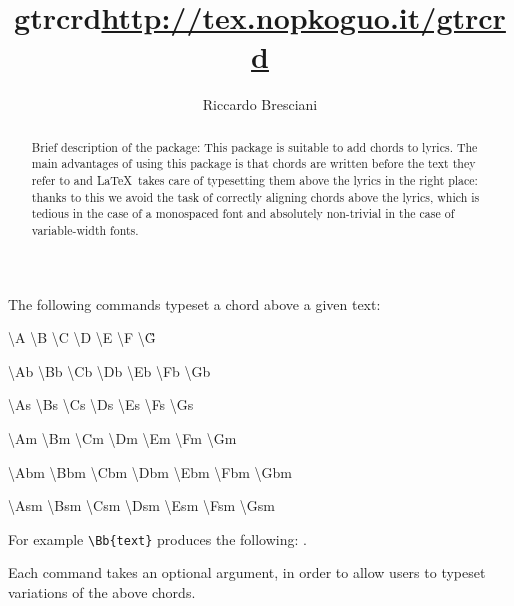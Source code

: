 \documentclass[green,a4paper,oneside,openany,noparindent,noparskip,article,nomatter]{bookest}
\author{Riccardo Bresciani}
\title{gtrcrd\hfill{\small\href{http://tex.nopkoguo.it/gtrcrd}{http://tex.nopkoguo.it/gtrcrd}}}
\makeatletter
\newcommand{\belowLine}{{\normalsize Version 1.1 --- \today}}
\renewcommand{\maketitle}{\thispagestyle{plain}{\Huge\textbf{\colorB\@title}\Large\\\vspace{2ex}
\@author{\colorA\hrule}\vspace{1ex}\belowLine\\\vspace{2ex}}}
\makeatother
\begin{document}
\maketitle

\begin{abstract}{Brief description of the package:}
This package is suitable to add chords to lyrics. The main advantages of using this package is that chords are written before the text they refer to and \LaTeX\ takes care of typesetting them above the lyrics in the right place: thanks to this we avoid the task of correctly aligning chords above the lyrics, which is tedious in the case of a monospaced font and absolutely non-trivial in the case of variable-width fonts.
\end{abstract}


The following commands typeset a chord above a given text:

\begin{center}
\ttfamily \textbackslash\A A \quad\textbackslash\B B \quad\textbackslash\C C \quad\textbackslash\D D \quad\textbackslash\E E \quad\textbackslash\F F \quad\textbackslash\G G

\textbackslash\Ab Ab \quad\textbackslash\Bb Bb \quad\textbackslash\Cb Cb \quad\textbackslash\Db Db \quad\textbackslash\Eb Eb \quad\textbackslash\Fb Fb \quad\textbackslash\Gb Gb

\textbackslash\As As \quad\textbackslash\Bs Bs \quad\textbackslash\Cs Cs \quad\textbackslash\Ds Ds \quad\textbackslash\Es Es \quad\textbackslash\Fs Fs \quad\textbackslash\Gs Gs

\textbackslash\Am Am \quad\textbackslash\Bm Bm \quad\textbackslash\Cm Cm \quad\textbackslash\Dm Dm \quad\textbackslash\Em Em \quad\textbackslash\Fm Fm \quad\textbackslash\Gm Gm

\textbackslash\Abm Abm \quad\textbackslash\Bbm Bbm \quad\textbackslash\Cbm Cbm \quad\textbackslash\Dbm Dbm \quad\textbackslash\Ebm Ebm \quad\textbackslash\Fbm Fbm \quad\textbackslash\Gbm Gbm

\textbackslash\Asm Asm \quad\textbackslash\Bsm Bsm \quad\textbackslash\Csm Csm \quad\textbackslash\Dsm Dsm \quad\textbackslash\Esm Esm \quad\textbackslash\Fsm Fsm \quad\textbackslash\Gsm Gsm
\end{center}

For example \texttt{\textbackslash Bb\{text\}} produces the following: .

\ppar
Each command takes an optional argument, in order to allow users to typeset variations of the above chords.
\end{document}
